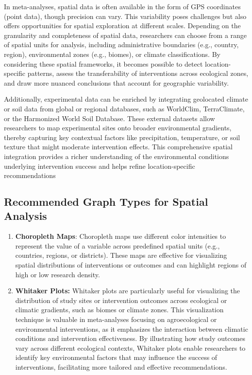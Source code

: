 \documentclass[
]{book}
\begin{document}
In meta-analyses, spatial data is often available in the form of GPS coordinates (point data), though precision can vary.
This variability poses challenges but also offers opportunities for spatial exploration at different scales.
Depending on the granularity and completeness of spatial data, researchers can choose from a range of spatial units for analysis, including administrative boundaries (e.g., country, region), environmental zones (e.g., biomes), or climate classifications.
By considering these spatial frameworks, it becomes possible to detect location-specific patterns, assess the transferability of interventions across ecological zones, and draw more nuanced conclusions that account for geographic variability.

Additionally, experimental data can be enriched by integrating geolocated climate or soil data from global or regional databases, such as WorldClim, TerraClimate, or the Harmonized World Soil Database.
These external datasets allow researchers to map experimental sites onto broader environmental gradients, thereby capturing key contextual factors like precipitation, temperature, or soil texture that might moderate intervention effects.
This comprehensive spatial integration provides a richer understanding of the environmental conditions underlying intervention success and helps refine location-specific recommendations

\subsection{Recommended Graph Types for Spatial Analysis}\label{recommended-graph-types-for-spatial-analysis}

\begin{enumerate}
\def\labelenumi{\arabic{enumi}.}
\item
  \textbf{Choropleth Maps}: Choropleth maps use different color intensities to represent the value of a variable across predefined spatial units (e.g., countries, regions, or districts).
  These maps are effective for visualizing spatial distributions of interventions or outcomes and can highlight regions of high or low research density.
\item
  \textbf{Whitaker Plots:} Whitaker plots are particularly useful for visualizing the distribution of study sites or intervention outcomes across ecological or climatic gradients, such as biomes or climate zones.
  This visualization technique is valuable in meta-analyses focusing on agroecological or environmental interventions, as it emphasizes the interaction between climatic conditions and intervention effectiveness.
  By illustrating how study outcomes vary across different ecological contexts, Whitaker plots enable researchers to identify key environmental factors that may influence the success of interventions, facilitating more tailored and effective recommendations.
\end{enumerate}
\end{document}
